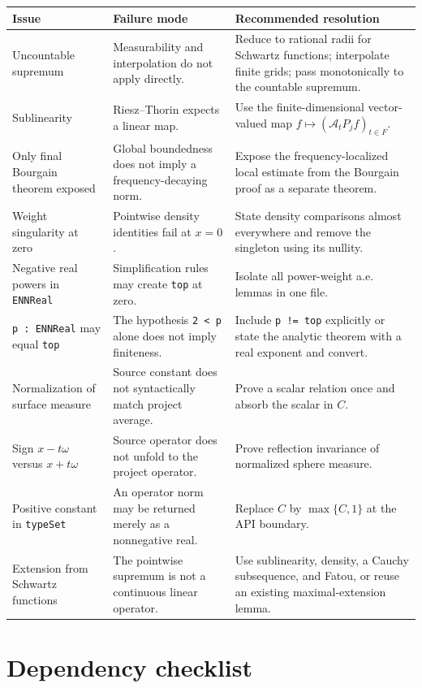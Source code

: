 \documentclass[11pt,a4paper]{article}
\theoremstyle{definition}
\theoremstyle{remark}
\newcommand{\A}{\mathcal{A}}
\newcommand{\lean}{\texttt}
\begin{document}
\begin{longtable}{p{}p{}p{}}
\toprule
Issue & Failure mode & Recommended resolution \\
\midrule
\endhead
Uncountable supremum & Measurability and interpolation do not apply directly. &
Reduce to rational radii for Schwartz functions; interpolate finite grids;
pass monotonically to the countable supremum. \\
\addlinespace
Sublinearity & Riesz--Thorin expects a linear map. &
Use the finite-dimensional vector-valued map
$f\mapsto(\A_tP_jf)_{t\in F}$. \\
\addlinespace
Only final Bourgain theorem exposed & Global boundedness does not imply a
frequency-decaying norm. & Expose the frequency-localized local estimate from
the Bourgain proof as a separate theorem. \\
\addlinespace
Weight singularity at zero & Pointwise density identities fail at $x=0$. &
State density comparisons almost everywhere and remove the singleton using
its nullity. \\
\addlinespace
Negative real powers in \lean{ENNReal} & Simplification rules may create
\lean{top} at zero. & Isolate all power-weight a.e. lemmas in one file. \\
\addlinespace
\lean{p : ENNReal} may equal \lean{top} & The hypothesis \lean{2 < p} alone
does not imply finiteness. & Include \lean{p != top} explicitly or state the
analytic theorem with a real exponent and convert. \\
\addlinespace
Normalization of surface measure & Source constant does not syntactically
match project average. & Prove a scalar relation once and absorb the scalar in
$C$. \\
\addlinespace
Sign $x-t\omega$ versus $x+t\omega$ & Source operator does not unfold to the
project operator. & Prove reflection invariance of normalized sphere measure. \\
\addlinespace
Positive constant in \lean{typeSet} & An operator norm may be returned merely
as a nonnegative real. & Replace $C$ by $\max\{C,1\}$ at the API boundary. \\
\addlinespace
Extension from Schwartz functions & The pointwise supremum is not a continuous
linear operator. & Use sublinearity, density, a Cauchy subsequence, and Fatou,
or reuse an existing maximal-extension lemma. \\
\bottomrule
\end{longtable}

\section{Dependency checklist}
\end{document}
